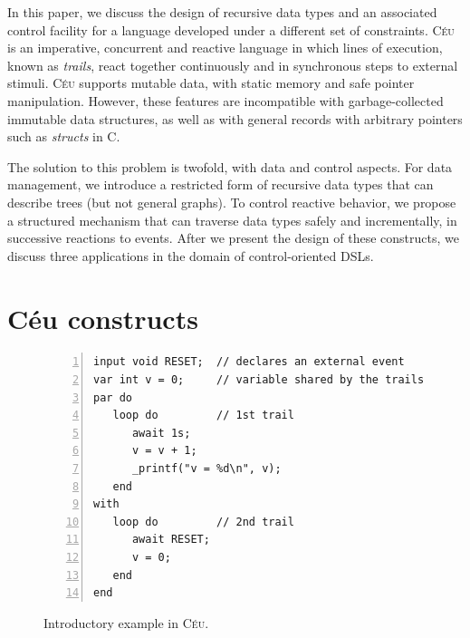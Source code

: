 \documentclass{sig-alternate}
\newcommand{\CEU}{\textsc{C\'{e}u}\xspace}
\newcommand{\code}[1] {{\small{\texttt{#1}}}}
\begin{document}
In this paper, we discuss the design of recursive data types and an associated
control facility for a language developed under a different set of
constraints.
\CEU~\cite{ceu.sensys13,ceu.mod15} is an imperative, concurrent and reactive 
language in which lines of execution, known as \emph{trails}, react 
together continuously and in synchronous steps to external stimuli.
\CEU supports mutable data, with static memory and safe pointer 
manipulation.
However, these features are incompatible with garbage-collected immutable data 
structures, as well as with general records with arbitrary pointers such as 
\emph{structs} in C.

The solution to this problem is twofold, with data and control aspects.
For data management, we introduce a restricted form of recursive data types 
that can describe trees (but not general graphs).
To control reactive behavior, we propose a structured mechanism that can 
traverse data types safely and incrementally, in successive reactions to 
events.
%
After we present the design of these constructs, we discuss three applications 
in the domain of control-oriented DSLs.

\section{C\'eu constructs}
\label{sec.ceu}

\begin{figure}[t]
\begin{lstlisting}[numbers=left,xleftmargin=3em]
input void RESET;  // declares an external event
var int v = 0;     // variable shared by the trails
par do
   loop do         // 1st trail
      await 1s;
      v = v + 1;
      _printf("v = %d\n", v);
   end
with
   loop do         // 2nd trail
      await RESET;
      v = 0;
   end
end
\end{lstlisting}
\caption{ Introductory example in \CEU.
\label{lst.intro}
}
\end{figure}
\end{document}
